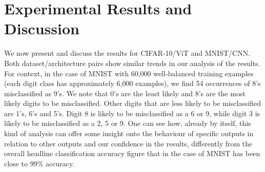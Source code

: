 


\section{Experimental Results and Discussion}

We now present and discuss the results for CIFAR-10/ViT and MNIST/CNN. Both dataset/architecture pairs show similar trends in our analysis of the results. For context, in the case of MNIST with 60,000 well-balanced training examples (each digit class has approximately 6,000 examples), we find 54 occurrences of 8's misclassified as 9's. We note that 0's are the least likely and 8's are the most likely digits to be misclassified. Other digits that are less likely to be misclassified are 1's, 6's and 5's. Digit 8 is likely to be misclassified as a 6 or 9, while digit 3 is likely to be misclassified as a 2, 5 or 9. One can see how, already by itself, this kind of analysis can offer some insight onto the behaviour of specific outputs in relation to other outputs and our confidence in the results, differently from the overall headline classification accuracy figure that in the case of MNIST has been close to $99\%$ accuracy. 


